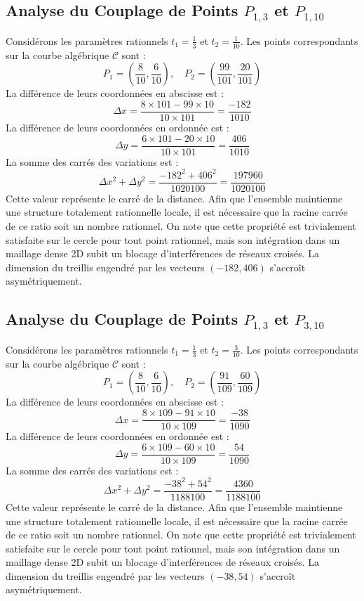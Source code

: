 \documentclass[12pt, a4paper]{article}
\begin{document}
\subsection{Analyse du Couplage de Points $P_{1,3}$ et $P_{1,10}$}
Considérons les paramètres rationnels $t_1 = \frac{1}{3}$ et $t_2 = \frac{1}{10}$.
Les points correspondants sur la courbe algébrique $\mathcal{C}$ sont :
$$ P_1 = \left( \frac{8}{10}, \frac{6}{10} \right), \quad P_2 = \left( \frac{99}{101}, \frac{20}{101} \right) $$
La différence de leurs coordonnées en abscisse est :
$$ \Delta x = \frac{8 \times 101 - 99 \times 10}{10 \times 101} = \frac{-182}{1010} $$
La différence de leurs coordonnées en ordonnée est :
$$ \Delta y = \frac{6 \times 101 - 20 \times 10}{10 \times 101} = \frac{406}{1010} $$
La somme des carrés des variations est :
$$ \Delta x^2 + \Delta y^2 = \frac{ -182^2 + 406^2 }{ 1020100 } = \frac{ 197960 }{ 1020100 } $$
Cette valeur représente le carré de la distance. Afin que l'ensemble maintienne une structure totalement rationnelle locale, il est nécessaire que la racine carrée de ce ratio soit un nombre rationnel. On note que cette propriété est trivialement satisfaite sur le cercle pour tout point rationnel, mais son intégration dans un maillage dense 2D subit un blocage d'interférences de réseaux croisés. La dimension du treillis engendré par les vecteurs $( -182, 406 )$ s'accroît asymétriquement.


\subsection{Analyse du Couplage de Points $P_{1,3}$ et $P_{3,10}$}
Considérons les paramètres rationnels $t_1 = \frac{1}{3}$ et $t_2 = \frac{3}{10}$.
Les points correspondants sur la courbe algébrique $\mathcal{C}$ sont :
$$ P_1 = \left( \frac{8}{10}, \frac{6}{10} \right), \quad P_2 = \left( \frac{91}{109}, \frac{60}{109} \right) $$
La différence de leurs coordonnées en abscisse est :
$$ \Delta x = \frac{8 \times 109 - 91 \times 10}{10 \times 109} = \frac{-38}{1090} $$
La différence de leurs coordonnées en ordonnée est :
$$ \Delta y = \frac{6 \times 109 - 60 \times 10}{10 \times 109} = \frac{54}{1090} $$
La somme des carrés des variations est :
$$ \Delta x^2 + \Delta y^2 = \frac{ -38^2 + 54^2 }{ 1188100 } = \frac{ 4360 }{ 1188100 } $$
Cette valeur représente le carré de la distance. Afin que l'ensemble maintienne une structure totalement rationnelle locale, il est nécessaire que la racine carrée de ce ratio soit un nombre rationnel. On note que cette propriété est trivialement satisfaite sur le cercle pour tout point rationnel, mais son intégration dans un maillage dense 2D subit un blocage d'interférences de réseaux croisés. La dimension du treillis engendré par les vecteurs $( -38, 54 )$ s'accroît asymétriquement.
\end{document}

